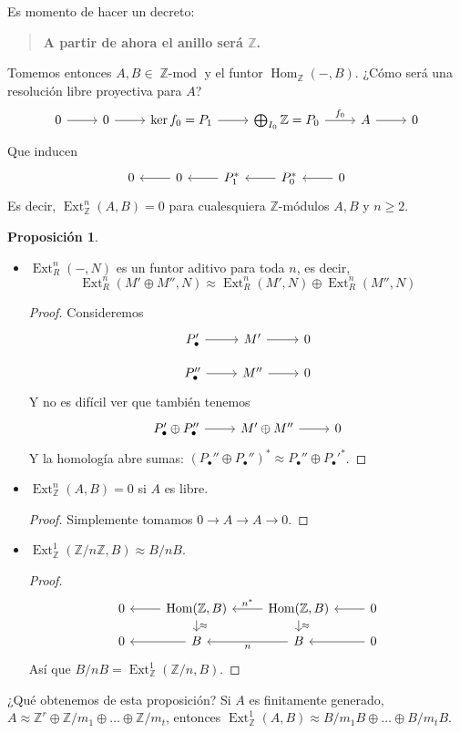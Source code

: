 \documentclass[spanish]{book}
\theoremstyle{definition}
\newtheorem*{prop}{Proposición}
\newcommand{\Z}{\mathbb{Z}}
\DeclareMathOperator{\ZMod}{\mathbb{Z}\text{-}mod}
\DeclareMathOperator{\Hom}{Hom}
\DeclareMathOperator{\Ext}{Ext}
\begin{document}
Es momento de hacer un decreto:
\begin{quotation}
	\textbf{A partir de ahora el anillo será $\Z$.}
\end{quotation}
Tomemos entonces $A,B\in\ZMod$ y el funtor $\Hom_\Z(-,B)$. ¿Cómo será una resolución libre proyectiva para $A$?
\[\begin{tikzcd}
	0\arrow[r]&0\arrow[r]&\ker f_0=P_1\arrow[r]&\bigoplus_{I_0}\Z=P_0\arrow[r,"f_0"]&A\arrow[r]&0
\end{tikzcd}\]
Que inducen
\[\begin{tikzcd}
	0&0\arrow[l]&P_1^*\arrow[l]&P_0^*\arrow[l]&0\arrow[l]
\end{tikzcd}\]
Es decir, $\Ext^n_\Z(A,B)=0$ para cualesquiera $\Z$-módulos $A,B$ y $n\geq2$.
\begin{prop}\leavevmode
	\begin{itemize}
		\item $\Ext^n_R(-,N)$ es un funtor aditivo para toda $n$, es decir,
		\[\Ext_R^n(M'\oplus M'',N)\approx\Ext_R^n(M',N)\oplus\Ext^n_R(M'',N)\]
		\begin{proof}
			Consideremos
			\[\begin{tikzcd}[row sep=small]
				P'_\bullet\arrow[r]&M'\arrow[r]&0\\
				P''_\bullet\arrow[r]&M''\arrow[r]&0
			\end{tikzcd}\]
			Y no es difícil ver que también tenemos
			\[\begin{tikzcd}
				P'_\bullet\oplus P''_\bullet\arrow[r]&M'\oplus M''\arrow[r]&0
			\end{tikzcd}\]
			Y la homología abre sumas: $(P_\bullet''\oplus P_\bullet'')^*\approx P_\bullet''\oplus P_\bullet'^*$.
		\end{proof}
		\item $\Ext^n_\Z(A,B)=0$ si $A$ es libre.
		\begin{proof}
			Simplemente tomamos $0\to A\to A\to 0$.
		\end{proof}
		\item $\Ext^1_\Z(\Z/n\Z,B)\approx B/nB$.
		\begin{proof}
			\[\begin{tikzcd}[row sep=small]
				0&\Hom(\Z,B)\arrow[l]\arrow[d,"\approx"]&\Hom(\Z,B)\arrow[l,swap,"n^*"]\arrow[d,"\approx"]&0\arrow[l]\\
				0&B\arrow[l]&B\arrow[l,"n"]&0\arrow[l]
			\end{tikzcd}\]
			Así que $B/nB=\Ext_\Z^1(\Z/n,B)$.
		\end{proof}
	\end{itemize}
\end{prop}
¿Qué obtenemos de esta proposición? Si $A$ es finitamente generado, $A\approx\Z^r\oplus\Z/m_1\oplus\ldots\oplus\Z/m_t$, entonces $\Ext^1_\Z(A,B)\approx B/m_1B\oplus\ldots\oplus B/m_tB$.
\end{document}
